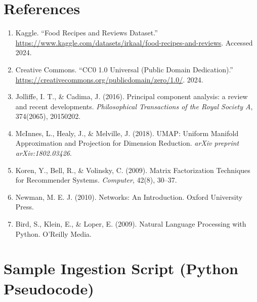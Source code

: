 \documentclass[11pt,a4paper]{article}
\begin{document}
\section*{References}

\begin{enumerate}
    \item Kaggle. ``Food Recipes and Reviews Dataset.'' \url{https://www.kaggle.com/datasets/irkaal/food-recipes-and-reviews}. Accessed 2024.
    
    \item Creative Commons. ``CC0 1.0 Universal (Public Domain Dedication).'' \url{https://creativecommons.org/publicdomain/zero/1.0/}. 2024.
    
    \item Jolliffe, I. T., \& Cadima, J. (2016). Principal component analysis: a review and recent developments. \textit{Philosophical Transactions of the Royal Society A}, 374(2065), 20150202.
    
    \item McInnes, L., Healy, J., \& Melville, J. (2018). UMAP: Uniform Manifold Approximation and Projection for Dimension Reduction. \textit{arXiv preprint arXiv:1802.03426}.
    
    \item Koren, Y., Bell, R., \& Volinsky, C. (2009). Matrix Factorization Techniques for Recommender Systems. \textit{Computer}, 42(8), 30--37.
    
    \item Newman, M. E. J. (2010). Networks: An Introduction. Oxford University Press.
    
    \item Bird, S., Klein, E., \& Loper, E. (2009). Natural Language Processing with Python. O'Reilly Media.
\end{enumerate}

\newpage

\appendix

\section{Sample Ingestion Script (Python Pseudocode)}
\end{document}
